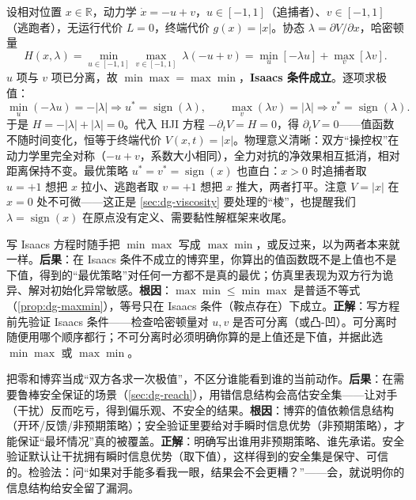 \begin{example}[一个算到底的一维追逃]
\label{ex:dg-1d}
设相对位置 $x\in\mathbb{R}$，动力学 $\dot x=-u+v$，$u\in[-1,1]$（追捕者）、$v\in[-1,1]$（逃跑者），无运行代价 $L=0$，终端代价 $g(x)=|x|$。协态 $\lambda=\partial V/\partial x$，哈密顿量
\[
  H(x,\lambda)=\min_{u\in[-1,1]}\max_{v\in[-1,1]}\ \lambda(-u+v)=\min_u[-\lambda u]+\max_v[\lambda v].
\]
$u$ 项与 $v$ 项已分离，故 $\min\max=\max\min$，\textbf{Isaacs 条件成立}。逐项求极值：
\[
  \min_{u}(-\lambda u)=-|\lambda|\Rightarrow u^*=\operatorname{sign}(\lambda),\qquad \max_{v}(\lambda v)=|\lambda|\Rightarrow v^*=\operatorname{sign}(\lambda).
\]
于是 $H=-|\lambda|+|\lambda|=0$。代入 HJI 方程 $-\partial_t V=H=0$，得 $\partial_t V=0$——值函数不随时间变化，恒等于终端代价 $V(x,t)=|x|$。物理意义清晰：双方“操控权”在动力学里完全对称（$-u+v$，系数大小相同），全力对抗的净效果相互抵消，相对距离保持不变。最优策略 $u^*=v^*=\operatorname{sign}(x)$ 也直白：$x>0$ 时追捕者取 $u=+1$ 想把 $x$ 拉小、逃跑者取 $v=+1$ 想把 $x$ 推大，两者打平。注意 $V=|x|$ 在 $x=0$ 处不可微——这正是 \cref{sec:dg-viscosity} 要处理的“棱”，也提醒我们 $\lambda=\operatorname{sign}(x)$ 在原点没有定义、需要黏性解框架来收尾。
\end{example}

\begin{pitfall}[思维陷阱：默认 $\min_u\max_v=\max_v\min_u$]
写 Isaacs 方程时随手把 $\min\max$ 写成 $\max\min$，或反过来，以为两者本来就一样。\textbf{后果}：在 Isaacs 条件不成立的博弈里，你算出的值函数既不是上值也不是下值，得到的“最优策略”对任何一方都不是真的最优；仿真里表现为双方行为诡异、解对初始化异常敏感。\textbf{根因}：$\max\min\le\min\max$ 是普适不等式（\cref{prop:dg-maxmin}），等号只在 Isaacs 条件（鞍点存在）下成立。\textbf{正解}：写方程前先验证 Isaacs 条件——检查哈密顿量对 $u,v$ 是否可分离（或凸-凹）。可分离时随便用哪个顺序都行；不可分离时必须明确你算的是上值还是下值，并据此选 $\min\max$ 或 $\max\min$。
\end{pitfall}

\begin{pitfall}
把零和博弈当成“双方各求一次极值”，不区分谁能看到谁的当前动作。\textbf{后果}：在需要鲁棒安全保证的场景（\cref{sec:dg-reach}），用错信息结构会高估安全集——让对手（干扰）反而吃亏，得到偏乐观、不安全的结果。\textbf{根因}：博弈的值依赖信息结构（开环/反馈/非预期策略）；安全验证里要给对手瞬时信息优势（非预期策略），才能保证“最坏情况”真的被覆盖。\textbf{正解}：明确写出谁用非预期策略、谁先承诺。安全验证默认让干扰拥有瞬时信息优势（取下值），这样得到的安全集是保守、可信的。检验法：问“如果对手能多看我一眼，结果会不会更糟？”——会，就说明你的信息结构给安全留了漏洞。
\end{pitfall}

